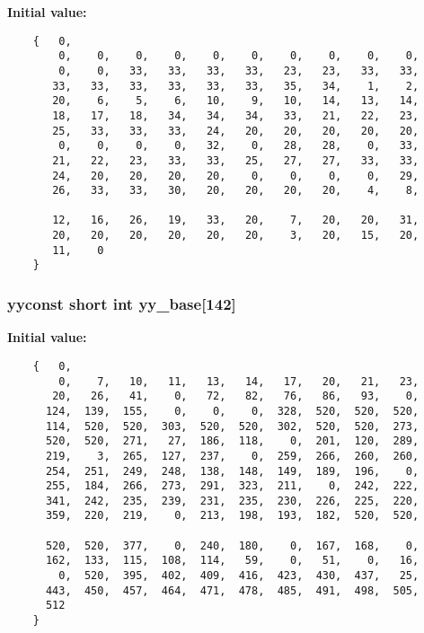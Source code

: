 {\bf Initial value:}

\footnotesize\begin{verbatim}
    {   0,
        0,    0,    0,    0,    0,    0,    0,    0,    0,    0,
        0,    0,   33,   33,   33,   33,   23,   23,   33,   33,
       33,   33,   33,   33,   33,   33,   35,   34,    1,    2,
       20,    6,    5,    6,   10,    9,   10,   14,   13,   14,
       18,   17,   18,   34,   34,   34,   33,   21,   22,   23,
       25,   33,   33,   33,   24,   20,   20,   20,   20,   20,
        0,    0,    0,    0,   32,    0,   28,   28,    0,   33,
       21,   22,   23,   33,   33,   25,   27,   27,   33,   33,
       24,   20,   20,   20,   20,    0,    0,    0,    0,   29,
       26,   33,   33,   30,   20,   20,   20,   20,    4,    8,

       12,   16,   26,   19,   33,   20,    7,   20,   20,   31,
       20,   20,   20,   20,   20,   20,    3,   20,   15,   20,
       11,    0
    }\end{verbatim}\normalsize 
{}
\subsubsection{\setlength{\rightskip}{0pt plus 5cm}yyconst short int yy\_\-base[142]\hspace{0.3cm}{\tt  [static]}}\label{vcd__lexer_8c_a97}


{\bf Initial value:}

\footnotesize\begin{verbatim}
    {   0,
        0,    7,   10,   11,   13,   14,   17,   20,   21,   23,
       20,   26,   41,    0,   72,   82,   76,   86,   93,    0,
      124,  139,  155,    0,    0,    0,  328,  520,  520,  520,
      114,  520,  520,  303,  520,  520,  302,  520,  520,  273,
      520,  520,  271,   27,  186,  118,    0,  201,  120,  289,
      219,    3,  265,  127,  237,    0,  259,  266,  260,  260,
      254,  251,  249,  248,  138,  148,  149,  189,  196,    0,
      255,  184,  266,  273,  291,  323,  211,    0,  242,  222,
      341,  242,  235,  239,  231,  235,  230,  226,  225,  220,
      359,  220,  219,    0,  213,  198,  193,  182,  520,  520,

      520,  520,  377,    0,  240,  180,    0,  167,  168,    0,
      162,  133,  115,  108,  114,   59,    0,   51,    0,   16,
        0,  520,  395,  402,  409,  416,  423,  430,  437,   25,
      443,  450,  457,  464,  471,  478,  485,  491,  498,  505,
      512
    }\end{verbatim}\normalsize 
{}
